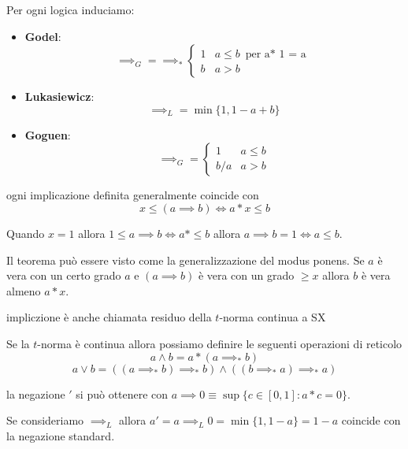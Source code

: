 \begin{esempio}
    Per ogni logica induciamo:
    \begin{itemize}
        \item \textbf{Godel}: $$\implies_G= \implies_\ast \begin{cases}
            1 & a\le b \text{ per a$\ast$ 1 = a}\\
            b & a >b
        \end{cases}$$ 
        \item \textbf{Lukasiewicz}: $$\implies_L = \min\{1,1-a+b\}$$
        \item \textbf{Goguen}: $$\implies_G =  \begin{cases}
            1 & a\le b\\
            b/a & a >b
        \end{cases}$$ 
    \end{itemize}

\end{esempio}

\begin{teorema}
    ogni implicazione definita generalmente coincide con  
    $$x\le (a\implies b ) \iff a\ast x \le b$$
    
\end{teorema}
Quando $x =1$ allora $1\le a\implies b \iff a\ast \le b$ 
allora $a\implies b = 1 \iff a\le b$. 

Il teorema può essere visto come la generalizzazione del modus ponens.
Se $a$ è vera con un certo grado $a$ e $(a\implies b)$ è vera con un grado $\ge x$ allora $b$ è vera almeno $a\ast x$. 

\begin{nota}
    impliczione è anche chiamata residuo della $t$-norma continua a SX
\end{nota}

Se la $t$-norma è continua allora possiamo definire le seguenti operazioni di reticolo
$$a\land b = a\ast (a\implies_\ast b)$$
$$a\lor b = ((a\implies_\ast b )\implies_\ast b)\land ((b\implies_\ast a) \implies_\ast a)$$

\begin{definizione}
    la negazione $'$ si può ottenere con $a\implies 0 \equiv \sup \{c\in [0,1]: a\ast c =0\}$.
    
\end{definizione}


\begin{esempio}
    Se consideriamo $\implies_L$ allora $a'= a\implies_L 0 = \min\{1,1-a\} = 1-a$ 
    coincide con la negazione standard.
\end{esempio}

